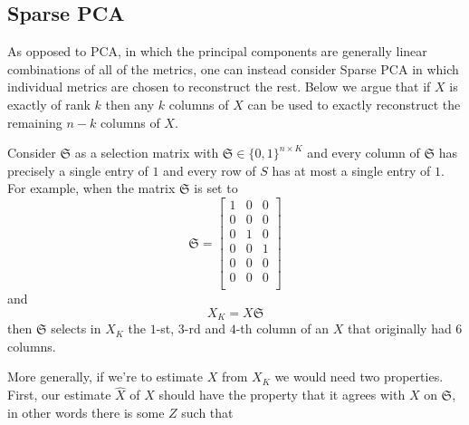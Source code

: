 \documentclass[conference]{IEEEtran}
\begin{document}
\subsection{Sparse PCA}\label{SPCA}


As opposed to PCA, in which the principal components are generally linear combinations of all of the metrics, one can instead consider Sparse PCA \cite{htf01} in which individual metrics are chosen to reconstruct the rest. Below we argue that  if $X$ is exactly of rank $k$ then any $k$ columns of $X$ can be used to exactly reconstruct the remaining $n-k$ columns of $X$.

Consider $\mathfrak{S}$ as a selection matrix with $\mathfrak{S} \in \{0,1\}^{n \times K}$ and every column of $\mathfrak{S}$ has precisely a single entry of $1$ and every row of $S$ has at most a single entry of $1$.
For example, when the matrix $\mathfrak{S}$ is set to
$$
\mathfrak{S} = 
\begin{bmatrix}
1 & 0 & 0 \\
0 & 0 & 0 \\
0 & 1 & 0 \\
0 & 0 & 1 \\
0 & 0 & 0 \\
0 & 0 & 0 \\
\end{bmatrix}
$$
\noindent
and
$$X_K = X \mathfrak{S}$$
\noindent
then $\mathfrak{S}$  selects in $X_K$ the $1$-st, $3$-rd and $4$-th column of an $X$ that originally had $6$ columns.  


More generally, if we're to estimate $X$ from $X_K$ we would need two properties.
First, our estimate $\hat{X}$ of $X$ should have the property that it agrees with $X$ on $\mathfrak{S}$, in other words there is some $Z$ such that
\end{document}
